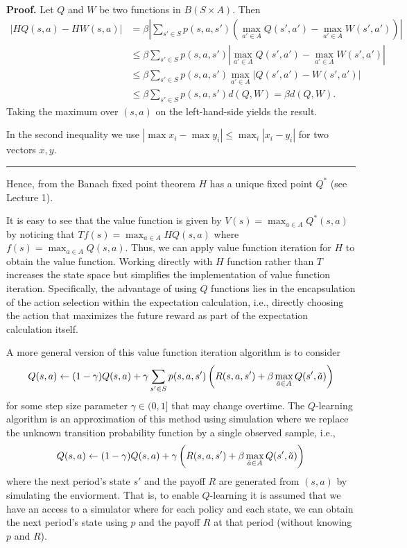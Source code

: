 \documentclass[letter,11pt]{article}
\newenvironment {proof}[1][Proof]{\noindent \textbf {#1.} }{\ \rule {0.5em}{0.5em}}
\begin{document}
\begin{proof}
    Let $Q$ and $W$ be two functions in $B(S \times A)$. Then 
    \begin{align*}
        | HQ(s,a) - HW(s,a) | & =    \beta \left | \sum _{s' \in S}p(s,a,s')\left ( \max_{a' \in A} Q(s' , a') - \max_{a' \in A} W(s' , a')\right ) \right | \\
        & \leq  \beta  \sum _{s' \in S}p(s,a,s') \left | \max_{a' \in A} Q(s' , a') - \max_{a' \in A} W(s' , a') \right | \\
          & \leq  \beta  \sum _{s' \in S}p(s,a,s') \max_{a' \in A} \left |  Q(s' , a') -  W(s' , a') \right | \\
           & \leq  \beta  \sum _{s' \in S}p(s,a,s') d(Q,W)  =  \beta d(Q,W). 
    \end{align*}
Taking the maximum over $(s,a)$ on the left-hand-side yields the result.

In the second inequality we use $| \max x_{i} - \max y_{i} | \leq \max_{i} |x_{i} - y_{i}| $ for two vectors $x,y$. 
\end{proof}


Hence, from the Banach fixed point theorem $H$ has a unique fixed point $Q^{*}$ (see Lecture 1).

It is easy to see that the value function is given by $V(s) = \max _{a \in A} Q^{*}(s,a)$ by noticing that $Tf (s) =  \max _{a \in A} HQ (s,a)$ where $f(s) = \max _{a \in A} Q(s,a)$. 
Thus, we can apply value function iteration for $H$ to obtain the value function. Working directly with $H$  function rather than $T$ increases the state space but simplifies the implementation of value function iteration. Specifically, the advantage of using $Q$ functions lies in the encapsulation of the action selection within the expectation calculation, i.e., directly choosing the action that maximizes the future reward as part of the expectation calculation itself.


A more general version of this value function iteration algorithm is to consider 
$$ Q(s,a) \leftarrow (1-\gamma) Q(s,a) +  \gamma \sum _{s' \in S} p(s,a,s') \left ( R(s,a,s') + \beta \max_{\Tilde{a} \in A} Q(s' , \Tilde{a}) \right )  $$
for some step size parameter $\gamma \in (0,1]$ that may change overtime. The $Q$-learning algorithm is an approximation of this method using simulation where we replace the unknown transition probability function by a single observed sample, i.e., 
$$ Q(s,a) \leftarrow (1-\gamma) Q(s,a) +  \gamma  \left ( R(s,a,s') + \beta \max_{\Tilde{a} \in A} Q(s' , \Tilde{a}) \right )  $$
where the next period's state $s'$ and the payoff $R$ are generated from $(s,a)$ by simulating the enviorment. That is, to enable $Q$-learning it is assumed that we have an access to a simulator where for each policy and each state, we can obtain the next period's state using $p$ and the payoff $R$ at that period (without knowing $p$ and $R$). 
\end{document}
